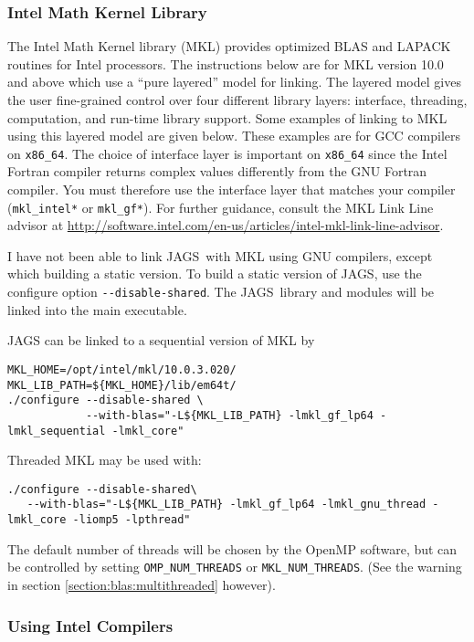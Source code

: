 \documentclass[11pt, a4paper, titlepage]{article}
\newcommand{\JAGS}{\textsf{JAGS}}
\begin{document}
\subsubsection{Intel Math Kernel Library}

The Intel Math Kernel library (MKL) provides optimized BLAS and LAPACK
routines for Intel processors. The instructions below are for MKL
version 10.0 and above which use a ``pure layered'' model for linking.
The layered model gives the user fine-grained control over four
different library layers: interface, threading, computation, and
run-time library support. Some examples of linking to MKL using this
layered model are given below. These examples are for GCC compilers on
\verb+x86_64+. The choice of interface layer is important on
\verb+x86_64+ since the Intel Fortran compiler returns complex values
differently from the GNU Fortran compiler. You must therefore use the
interface layer that matches your compiler (\verb+mkl_intel*+ or
\verb+mkl_gf*+).
For further guidance, consult the MKL Link Line advisor at
\url{http://software.intel.com/en-us/articles/intel-mkl-link-line-advisor}.

I have not been able to link \JAGS\ with MKL using GNU compilers, except
which building a static version. To build a static version of \JAGS,
use the configure option \verb+--disable-shared+. The \JAGS\ library and
modules will be linked into the main executable.

JAGS can be linked to a sequential version of MKL by
\begin{verbatim}
MKL_HOME=/opt/intel/mkl/10.0.3.020/
MKL_LIB_PATH=${MKL_HOME}/lib/em64t/
./configure --disable-shared \
            --with-blas="-L${MKL_LIB_PATH} -lmkl_gf_lp64 -lmkl_sequential -lmkl_core"
\end{verbatim}

Threaded MKL may be used with:
\begin{verbatim}
./configure --disable-shared\
   --with-blas="-L${MKL_LIB_PATH} -lmkl_gf_lp64 -lmkl_gnu_thread -lmkl_core -liomp5 -lpthread"
\end{verbatim}
The default number of threads will be chosen by the OpenMP software,
but can be controlled by setting \verb+OMP_NUM_THREADS+ or \verb+MKL_NUM_THREADS+.  (See the warning in section \ref{section:blas:multithreaded} however).

\subsubsection{Using Intel Compilers}
\end{document}
